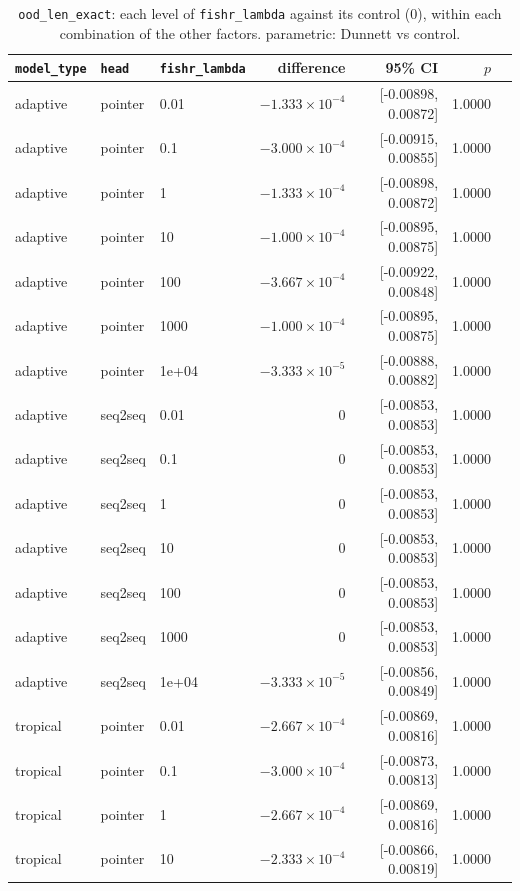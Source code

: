 \documentclass[10pt]{article}
\begin{document}
{\small
\begin{longtable}{lllrrrl}
\caption{\texttt{ood\_len\_exact}: each level of \texttt{fishr\_lambda} against its control (0), within each combination of the other factors. parametric: Dunnett vs control.}\label{tab:control-ood_len_exact}\\
\toprule
\texttt{model\_type} & \texttt{head} & \texttt{fishr\_lambda} & difference & 95\% CI & $p$ & \\
\midrule
\endhead
adaptive & pointer & 0.01 & $-1.333\times10^{-4}$ & [-0.00898, 0.00872] & 1.0000 & \\
adaptive & pointer & 0.1 & $-3.000\times10^{-4}$ & [-0.00915, 0.00855] & 1.0000 & \\
adaptive & pointer & 1 & $-1.333\times10^{-4}$ & [-0.00898, 0.00872] & 1.0000 & \\
adaptive & pointer & 10 & $-1.000\times10^{-4}$ & [-0.00895, 0.00875] & 1.0000 & \\
adaptive & pointer & 100 & $-3.667\times10^{-4}$ & [-0.00922, 0.00848] & 1.0000 & \\
adaptive & pointer & 1000 & $-1.000\times10^{-4}$ & [-0.00895, 0.00875] & 1.0000 & \\
adaptive & pointer & 1e+04 & $-3.333\times10^{-5}$ & [-0.00888, 0.00882] & 1.0000 & \\
adaptive & seq2seq & 0.01 & 0 & [-0.00853, 0.00853] & 1.0000 & \\
adaptive & seq2seq & 0.1 & 0 & [-0.00853, 0.00853] & 1.0000 & \\
adaptive & seq2seq & 1 & 0 & [-0.00853, 0.00853] & 1.0000 & \\
adaptive & seq2seq & 10 & 0 & [-0.00853, 0.00853] & 1.0000 & \\
adaptive & seq2seq & 100 & 0 & [-0.00853, 0.00853] & 1.0000 & \\
adaptive & seq2seq & 1000 & 0 & [-0.00853, 0.00853] & 1.0000 & \\
adaptive & seq2seq & 1e+04 & $-3.333\times10^{-5}$ & [-0.00856, 0.00849] & 1.0000 & \\
tropical & pointer & 0.01 & $-2.667\times10^{-4}$ & [-0.00869, 0.00816] & 1.0000 & \\
tropical & pointer & 0.1 & $-3.000\times10^{-4}$ & [-0.00873, 0.00813] & 1.0000 & \\
tropical & pointer & 1 & $-2.667\times10^{-4}$ & [-0.00869, 0.00816] & 1.0000 & \\
tropical & pointer & 10 & $-2.333\times10^{-4}$ & [-0.00866, 0.00819] & 1.0000 & \\

\end{longtable}}
\end{document}
